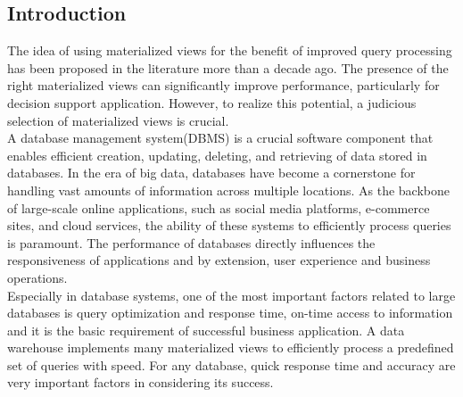 \subsection{Introduction}
The idea of using materialized views for the benefit of improved query processing has been proposed in the literature more than a decade ago.\cite{Blakeley1986EfficientlyUM} The presence of the right materialized views can significantly improve performance, particularly for decision support application. However, to realize this potential, a judicious selection of materialized views is crucial.\cite{agrawal2000automated}\\
A database management system(DBMS) is a crucial software component that enables efficient creation, updating, deleting, and retrieving of data stored in databases. In the era of big data, databases have become a cornerstone for handling vast amounts of information across multiple locations. As the backbone of large-scale online applications, such as social media platforms, e-commerce sites, and cloud services, the ability of these systems to efficiently process queries is paramount. The performance of databases directly influences the responsiveness of applications and by extension, user experience and business operations.\cite{4}\\
Especially in database systems, one of the most important factors related to large databases is query  optimization and response time, on-time access to information and it is the basic requirement of successful business application. A data warehouse implements many materialized views to efficiently process a predefined set of queries with speed. For any database, quick response time and accuracy are very important factors in considering its success.\cite{karde2010selection} 

